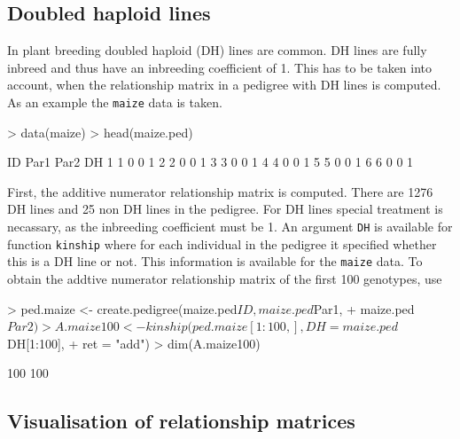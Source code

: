 \documentclass[a4paper,11pt]{article}
\begin{document}
\subsection{Doubled haploid lines}

In plant breeding doubled haploid (DH) lines are common. DH lines are fully inbreed and thus have an inbreeding coefficient of 1. This has to be taken into account, when the relationship matrix in a pedigree with DH lines is computed.  As an example the \texttt{maize} data is taken.
\begin{Schunk}
\begin{Sinput}
> data(maize)
> head(maize.ped)
\end{Sinput}
\begin{Soutput}
  ID Par1 Par2 DH
1  1    0    0  1
2  2    0    0  1
3  3    0    0  1
4  4    0    0  1
5  5    0    0  1
6  6    0    0  1
\end{Soutput}
\end{Schunk}
First, the additive numerator relationship matrix is computed. There are 1276 DH lines and 25 non DH lines in the pedigree. For DH lines special treatment is necassary, as the inbreeding coefficient must be 1. An argument \texttt{DH} is available for function \texttt{kinship} where
for each individual in the pedigree it specified whether this is a DH line or not. This information is available for the \texttt{maize} data. To obtain the addtive numerator relationship matrix of the first 100 genotypes, use 
\begin{Schunk}
\begin{Sinput}
> ped.maize <- create.pedigree(maize.ped$ID, maize.ped$Par1, 
+     maize.ped$Par2)
> A.maize100 <- kinship(ped.maize[1:100, ], DH = maize.ped$DH[1:100], 
+     ret = "add")
> dim(A.maize100)
\end{Sinput}
\begin{Soutput}
[1] 100 100
\end{Soutput}
\end{Schunk}

\subsection{Visualisation of relationship matrices}
\end{document}

